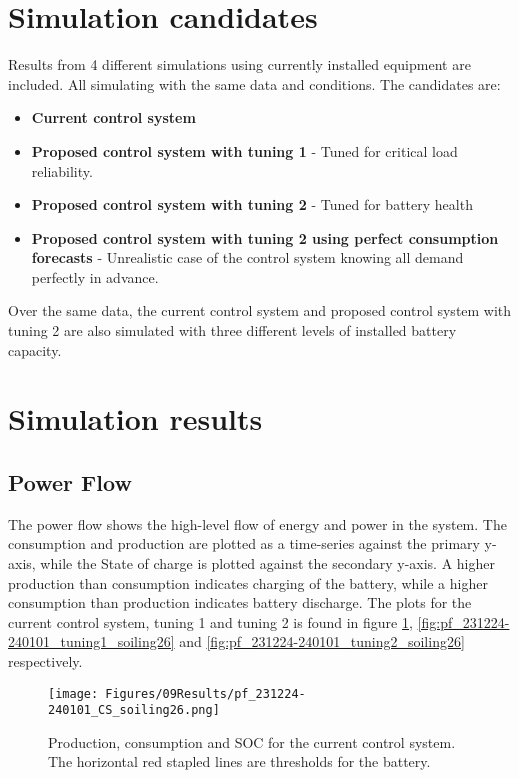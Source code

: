 \section{Simulation candidates}
Results from 4 different simulations using currently installed equipment are included. All simulating with the same data and conditions. The candidates are:
\begin{itemize}
    \item \textbf{Current control system}
    \item \textbf{Proposed control system with tuning 1} - Tuned for critical load reliability.
    \item \textbf{Proposed control system with tuning 2} - Tuned for battery health
    \item \textbf{Proposed control system with tuning 2 using perfect consumption forecasts} - Unrealistic case of the control system knowing all demand perfectly in advance.
\end{itemize}

Over the same data, the current control system and proposed control system with tuning 2 are also simulated with three different levels of installed battery capacity.

\section{Simulation results}
\subsection{Power Flow}

The power flow shows the high-level flow of energy and power in the system. The consumption and production are plotted as a time-series against the primary y-axis, while the State of charge is plotted against the secondary y-axis. A higher production than consumption indicates charging of the battery, while a higher consumption than production indicates battery discharge. The plots for the current control system, tuning 1 and tuning 2 is found in figure \ref{fig:pf_231224-240101_CS_soiling26}, \ref{fig:pf_231224-240101_tuning1_soiling26} and \ref{fig:pf_231224-240101_tuning2_soiling26} respectively. 

\begin{figure}[h]
    \centering
    \texttt{[image: Figures/09Results/pf\_231224-240101\_CS\_soiling26.png]}
    \caption[Power flow current control system]{Production, consumption and SOC for the current control system. The horizontal red stapled lines are thresholds for the battery. }
    \label{fig:pf_231224-240101_CS_soiling26}
\end{figure}

